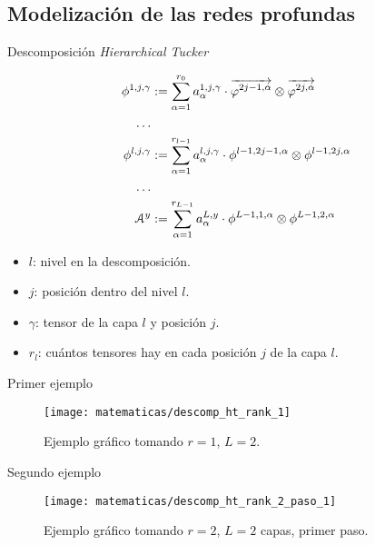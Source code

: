 \subsection{Modelización de las redes profundas}
\begin{frame}{Descomposición \textit{Hierarchical \textit{Tucker}}}

	\begin{equation} \label{eq:descomposicion_ht}
		\begin{split}
			\phi^{1, j, \gamma} &:= \sum_{\alpha = 1}^{r_0} a_{\alpha}^{1, j, \gamma} \cdot \overrightarrow{\varphi^{2j-1, \alpha}} \otimes \overrightarrow{\varphi^{2j, \alpha}} \\
			\ldots \\
			\phi^{l, j, \gamma} &:= \sum_{\alpha = 1}^{r_{l-1}} a_{\alpha}^{l, j, \gamma} \cdot \phi^{l-1, 2j-1, \alpha} \otimes \phi^{l-1, 2j, \alpha} \\
			\ldots \\
			\mathcal{A}^y &:= \sum_{\alpha = 1}^{r_{L-1}} a_{\alpha}^{L, y} \cdot \phi^{L-1, 1, \alpha} \otimes \phi^{L-1, 2, \alpha}
		\end{split}
	\end{equation}

	\begin{itemize}
		\item $l$: nivel en la descomposición.
		\item $j$: posición dentro del nivel $l$.
		\item $\gamma$: tensor de la capa $l$ y posición $j$.
		\item $r_l$: cuántos tensores hay en cada posición $j$ de la capa $l$.
	\end{itemize}

\end{frame}

\begin{frame}{Primer ejemplo}

	\begin{figure}
		\centering
		\texttt{[image: matematicas/descomp\_ht\_rank\_1]}
		\caption{Ejemplo gráfico tomando $r = 1$, $L = 2$.}
		\label{img:diagrama_ht_simple}
	\end{figure}

\end{frame}

\begin{frame}{Segundo ejemplo}

	\begin{figure}
		\texttt{[image: matematicas/descomp\_ht\_rank\_2\_paso\_1]}
		\caption{Ejemplo gráfico tomando $r = 2$, $L = 2$ capas, primer paso.}
	\end{figure}

\end{frame}

